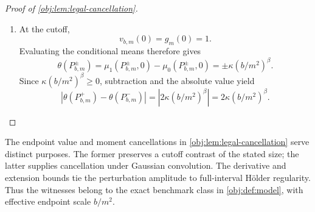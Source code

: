\documentclass[11pt]{article}
\begin{document}
\begin{proof}[Proof of \cref{obj:lem:legal-cancellation}]
\begin{enumerate}
The construction in \cref{obj:def:alternatives} uses an independent Gaussian factor. Its Gaussian marginal and product structure give
\[
\varepsilon\sim N(0,1),
\qquad
\varepsilon\perp(X,Y^0,Y^1),
\]
as required by \cref{obj:ass:gaussian,obj:ass:error-independence}. The uniform score and binary Bernoulli outcomes give the latent support in \cref{obj:def:model}. Moreover,
\[
f(P^\pm_{b,m},x)=\frac12
\qquad(x\in[-1,1]),
\qquad
\int_{-1}^1f(P^\pm_{b,m},x)\,dx=1.
\]
This density is continuous on the latent interval and satisfies \cref{obj:ass:density-bounds}. The conditional Bernoulli means are
\[
\mu_0(P^\pm_{b,m},x)=\frac12,
\qquad
\mu_1(P^\pm_{b,m},x)=p_\pm(x),
\]
which are continuous and satisfy \cref{obj:ass:mean-bounds}.

For distinct \(x,t\in[-1,1]\), the preceding Hölder estimate gives
\[
\begin{aligned}
|p_\pm(x)-p_\pm(t)|
&=\kappa(b/m^2)^\beta
|v_{b,m}(x)-v_{b,m}(t)|\\
&\le7\kappa(b/m^2)^\beta(b/m^2)^{-\beta}|x-t|^\beta\\
&=\frac7{100}|x-t|^\beta
\le2|x-t|^\beta,
\end{aligned}
\]
where
\[
(b/m^2)^\beta(b/m^2)^{-\beta}=1
\]
because \(b/m^2>0\). When \(x=t\), the same inequality follows from the zero difference. The untreated mean is constant, so
\[
[\mu_0(P^\pm_{b,m},\cdot)]_\beta=0,
\qquad
[\mu_1(P^\pm_{b,m},\cdot)]_\beta\le\frac7{100}\le2.
\]
Thus \cref{obj:ass:mean-holder} holds, completing all conditions of \cref{obj:def:model} for each sign and every \(\sigma\in\mathbb R\):
\[
P^\pm_{b,m}\in\mathcal M_\beta(\sigma).
\]

\item At the cutoff,
\[
v_{b,m}(0)=g_m(0)=1.
\]
Evaluating the conditional means therefore gives
\[
\theta(P^\pm_{b,m})
=\mu_1(P^\pm_{b,m},0)-\mu_0(P^\pm_{b,m},0)
=\pm\kappa(b/m^2)^\beta.
\]
Since \(\kappa(b/m^2)^\beta\ge0\), subtraction and the absolute value yield
\[
\left|\theta(P^+_{b,m})-\theta(P^-_{b,m})\right|
=\left|2\kappa(b/m^2)^\beta\right|
=2\kappa(b/m^2)^\beta.
\]
\end{enumerate}
\end{proof}

The endpoint value and moment cancellations in \cref{obj:lem:legal-cancellation} serve distinct purposes. The former preserves a cutoff contrast of the stated size; the latter supplies cancellation under Gaussian convolution. The derivative and extension bounds tie the perturbation amplitude to full-interval Hölder regularity. Thus the witnesses belong to the exact benchmark class in \cref{obj:def:model}, with effective endpoint scale \(b/m^2\).
\end{document}
